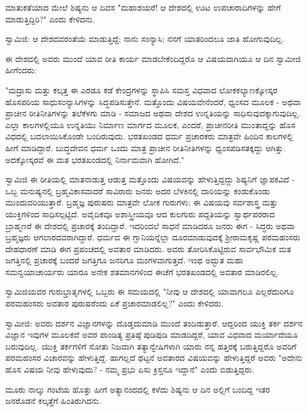 ಮಾತುಕತೆಯಾದ ಮೇಲೆ ಶಿಷ್ಯನು ಆ ದಿವಸ "ಮಹಾಶಯರೆ! ಆ ದೇಶದಲ್ಲಿ ಊಟ ಉಪಚಾರಾದಿಗಳನ್ನು ಹೇಗೆ ಮಾಡುತ್ತಿದ್ದಿರಿ?" ಎಂದು ಕೇಳಿದನು.

ಸ್ವಾಮಿಜಿ: ಆ ದೇಶದವರಂತೆಯೆ ಮಾಡುತ್ತಿದ್ದೆ; ನಾನು ಸಂನ್ಯಾಸಿ; ನನಗೆ ಯಾತರಿಂದಲೂ ಜಾತಿ ಹೋಗುವುದಿಲ್ಲ.

ಈ ದೇಶದಲ್ಲಿ ಅವರು ಮುಂದೆ ಯಾವ ರೀತಿ ಕಾರ್ಯ ಮಾಡಬೇಕೆಂದಿದ್ದರೊ ಆ ವಿಷಯವಾಗಿಯೂ ಆ ದಿನ ಸ್ವಾಮೀಜಿ ಹೀಗೆಂದರು:

"ಮದ್ರಾಸು ಮತ್ತು ಕಲ್ಕತ್ತ ಈ ಎರಡೂ ಕಡೆ ಕೇಂದ್ರಗಳನ್ನು ಸ್ಥಾಪಿಸಿ ಸಮಸ್ತ ವಿಧವಾದ ಲೋಕಕಲ್ಯಾಣಕ್ಕೋಸ್ಕರ ಹೊಸಪರಿಯ ಸಾಧುಸಂನ್ಯಾಸಿಗಳನ್ನು ಸಿದ್ಧಪಡಿಸುತ್ತೇನೆ. ಮತ್ತೊಂದು ವಿಷಯವೇನೆಂದರೆ, ಧ್ವಂಸದ ಮೂಲಕ - ಅಥವಾ ಪ್ರಾಚೀನ ರೀತಿನೀತಿಗಳನ್ನು ತಲೆಕೆಳಗು ಮಾಡಿ - ಸಮಾಜದ ಅಥವಾ ದೇಶದ ಉನ್ನತಿಯನ್ನು ಸಾಧಿಸುವುದಕ್ಕಾಗುವುದಿಲ್ಲ. ಎಲ್ಲಾ ಕಾಲಗಳಲ್ಲಿಯೂ ಉನ್ನತಿಯು ನಿರ್ಮಾಣ ಮಾರ್ಗದ ಮೂಲಕ, ಎಂದರೆ, ಪ್ರಾಚೀನರೀತಿ ಮುಂತಾದ್ದನ್ನು ಹೊಸ ವಿಧದಲ್ಲಿ ಬದಲಾಯಿಸಿಕೊಂಡೇ ಬಂದಿರುವುದು. ಭರತಖಂಡದ ಧರ್ಮ ಪ್ರಚಾರಕರು ಮಾತ್ರವೇ ಹಿಂದಿನ ಕಾಲಗಳಲ್ಲಿ ಹೀಗೆ ಮಾಡಿದ್ದಾರೆ. ಬುದ್ಧದೇವನ ಧರ್ಮ ಒಂದು ಮಾತ್ರ ಪ್ರಾಚೀನ ರೀತಿನೀತಿಗಳನ್ನು ಧ್ವಂಸಪಡಿಸತಕ್ಕದ್ದು ಆಗಿತ್ತು. ಅದಕ್ಕೋಸ್ಕರವೆ ಈ ಮತ ಭರತಖಂಡದಲ್ಲಿ ನಿರ್ನಾಮವಾಗಿ ಹೋಗಿದೆ."

ಸ್ವಾಮಿಜಿ ಈ ರೀತಿಯಲ್ಲಿ ಮಾತನಾಡುತ್ತ ಆಡುತ್ತ ಮತ್ತೊಂದು ವಿಷಯವನ್ನು ಹೇಳುತ್ತಿದ್ದದ್ದು ಶಿಷ್ಯನಿಗೆ ಜ್ಞಾಪಕವಿದೆ - ಒಬ್ಬ ಮನುಷ್ಯನಲ್ಲಿ ಬ್ರಹ್ಮವಿಕಾಸವಾದರೆ ಸಾವಿರಾರು ಜನರು ಅದರ ಬೆಳಕಿನಲ್ಲಿ ದಾರಿಯನ್ನು ಕಂಡುಕೊಂಡು ಮುಂದುವರಿಯುತ್ತಾರೆ. ಬ್ರಹ್ಮಜ್ಞ ಪುರುಷರು ಮಾತ್ರವೇ ಲೋಕ ಗುರುಗಳು; ಈ ವಿಷಯವು ಸರ್ವಶಾಸ್ತ್ರ ಮತ್ತು ಯುಕ್ತಿಗಳಿಂದ ಸಾಧಿಸಲ್ಪಟ್ಟಿದೆ. ಅವೈದಿಕವೂ ಅಶಾಸ್ತ್ರೀಯವೂ ಆದ ಕುಲಗುರು ಪದ್ದತಿಯನ್ನು ಸ್ವಾರ್ಥಪರರಾದ ಬ್ರಾಹ್ಮಣರೆ ಈ ದೇಶದಲ್ಲಿ ಪ್ರಚಾರಕ್ಕೆ ತಂದಿದ್ದಾರೆ. ಇದರಿಂದಲೆ ಸಾಧನೆ ಮಾಡಿದರೂ ಜನರು ಈಗ - ಸಿದ್ಧರು ಅಥವಾ ಬ್ರಹ್ಮಜ್ಞರು ಆಗಲಾರದವರಾಗಿದ್ದಾರೆ. ಧರ್ಮದ ಈ ಗ್ಲಾನಿಯನ್ನೆಲ್ಲಾ ದೂರಮಾಡುವುದಕ್ಕೆ ಶ‍್ರೀರಾಮಕೃಷ್ಣ ಪರಮಹಂಸರು ದೇಹಧಾರಣೆ ಮಾಡಿ ಈಗ ಪ್ರಪಂಚದಲ್ಲಿ ಅವತಾರ ಮಾಡಿದರು. ಅವರು ತೋರಿಸಿಕೊಟ್ಟಿರುವ ಸಾರ್ವಭೌಮಿಕ ಮತ ಜಗತ್ತಿನಲ್ಲಿ ಪ್ರಚಾರಕ್ಕೆ ಬಂದರೆ ಜಗತ್ತಿಗೂ ಜನರಿಗೂ ಮಂಗಳವಾಗುತ್ತದೆ. ಇಂಥ ಅದ್ಭುತ ಮಹಾ ಸಮನ್ವಯಾಚಾರ್ಯರು ಯಾರೂ ಅನೇಕ ಶತಮಾನಗಳಿಂದ ಈಚೆಗೆ ಭರತಖಂಡದಲ್ಲಿ ಅವತಾರ ಮಾಡಿರಲಿಲ್ಲ.

ಸ್ವಾಮಿಜಿಯವರ ಗುರುಭ್ರಾತೃಗಳಲ್ಲಿ ಒಬ್ಬರು ಈ ಸಮಯದಲ್ಲಿ "ನೀವು ಆ ದೇಶದಲ್ಲಿ ಯಾವಾಗಲೂ ಎಲ್ಲರೆದುರಿಗೂ ಪರಮಹಂಸರು ಅವತಾರ ಪುರುಷರೆಂದು ಏಕೆ ಪ್ರಚಾರಮಾಡಲಿಲ್ಲ?" ಎಂದು ಕೇಳಿದರು.

ಸ್ವಾಮೀಜಿ: ಅವರು ದರ್ಶನ ವಿಜ್ಞಾನಗಳನ್ನು ದೊಡ್ಡದುಮಾಡಿ ಮುಂದೆ ತಂದಿಡುತ್ತಾರೆ. ಆದ್ದರಿಂದ ಯುಕ್ತಿ ತರ್ಕ ದರ್ಶನ ವಿಜ್ಞಾನ ಇವುಗಳ ಮೂಲಕವೆ ಅವರ ಪಾಂಡಿತ್ಯ ಪ್ರತಿಷ್ಠೆ ಪುಡಿಪುಡಿ ಮಾಡದಿದ್ದರೆ, ಯಾವ ವಿಧವಾದ ಮರ್ಯಾದೆಯೂ ಬರುವುದಿಲ್ಲ. ಯುಕ್ತಿ ತರ್ಕಗಳಿಗೆ ಸೋತು ನಿಜವಾಗಿ ತತ್ಯಾನ್ವೇಷಿಗಳಾಗಿ ಯಾರು ನನ್ನ ಹತ್ತಿರಕ್ಕೆ ಬರುತ್ತಿದ್ದರೊ ಅವರಿಗೆ ಪರಮಹಂಸರ ವಿಚಾರವನ್ನು ಹೇಳುತ್ತಿದ್ದೆ. ಹಾಗಲ್ಲದೆ ಥಟ್ಟನೆ ಅವತಾರದ ವಿಷಯವನ್ನು ಹೇಳುತ್ತಿದ್ದರೆ ಅವರು "ಅದೇನು ಹೊಸ ವಿಷಯ ನೀವು ಹೇಳುವುದು? - ನಮ್ಮ ಪ್ರಭು ಏಸು ಕ್ರಿಸ್ತನೂ ಇದ್ದಾನೆ" ಎಂದು ಬಿಡುತ್ತಿದ್ದರು.

ಮೂರು ನಾಲ್ಕು ಗಂಟೆಯ ಹೊತ್ತು ಹೀಗೆ ಅತ್ಯಾನಂದದಲ್ಲಿ ಕಳೆದು ಶಿಷ್ಯನು ಆ ದಿನ ಅಲ್ಲಿಗೆ ಬಂದಿದ್ದ ಇತರ ಜನರೊಡನೆ ಕಲ್ಕತ್ತೆಗೆ ಹಿಂತಿರುಗಿದನು.

